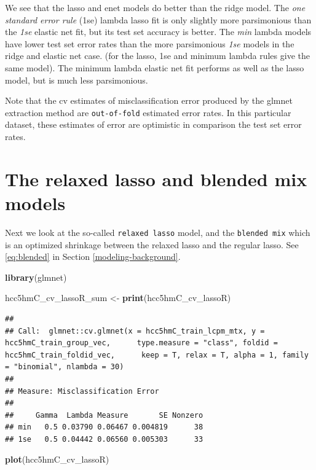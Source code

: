 \documentclass[
]{book}
\newenvironment{Shaded}{\begin{snugshade}}{\end{snugshade}}
\newcommand{\KeywordTok}[1]{\textcolor[rgb]{0.13,0.29,0.53}{\textbf{#1}}}
\newcommand{\NormalTok}[1]{#1}
\newcommand{\StringTok}[1]{\textcolor[rgb]{0.31,0.60,0.02}{#1}}
\begin{document}
We see that the lasso and enet models do better than the ridge model.
The \emph{one standard error rule} (1se) lambda lasso fit is only slightly more parsimonious than the
\emph{1se} elastic net fit, but its test set accuracy is better.
The \emph{min} lambda models have lower test set error rates than
the more parsimonious \emph{1se} models in the ridge and elastic net case.
(for the lasso, 1se and minimum lambda rules give the same model).
The minimum lambda elastic net fit performs as well as the lasso model,
but is much less parsimonious.

Note that the cv estimates of misclassification error produced by
the glmnet extraction method are \texttt{out-of-fold} estimated error rates.
In this particular dataset, these estimates of error are
optimistic in comparison the test set error rates.

\hypertarget{the-relaxed-lasso-and-blended-mix-models}{%
\section{The relaxed lasso and blended mix models}\label{the-relaxed-lasso-and-blended-mix-models}}

Next we look at the so-called \texttt{relaxed\ lasso} model, and
the \texttt{blended\ mix} which is an optimized shrinkage
between the relaxed lasso and the regular lasso.
See \eqref{eq:blended} in Section \ref{modeling-background}.

\begin{Shaded}
\begin{Highlighting}[]
\KeywordTok{library}\NormalTok{(glmnet)}

\NormalTok{hcc5hmC\_cv\_lassoR\_sum <{-}}\StringTok{ }\KeywordTok{print}\NormalTok{(hcc5hmC\_cv\_lassoR)}
\end{Highlighting}
\end{Shaded}

\begin{verbatim}
## 
## Call:  glmnet::cv.glmnet(x = hcc5hmC_train_lcpm_mtx, y = hcc5hmC_train_group_vec,      type.measure = "class", foldid = hcc5hmC_train_foldid_vec,      keep = T, relax = T, alpha = 1, family = "binomial", nlambda = 30) 
## 
## Measure: Misclassification Error 
## 
##     Gamma  Lambda Measure       SE Nonzero
## min   0.5 0.03790 0.06467 0.004819      38
## 1se   0.5 0.04442 0.06560 0.005303      33
\end{verbatim}

\begin{Shaded}
\begin{Highlighting}[]
\KeywordTok{plot}\NormalTok{(hcc5hmC\_cv\_lassoR)}
\end{Highlighting}
\end{Shaded}
\end{document}
